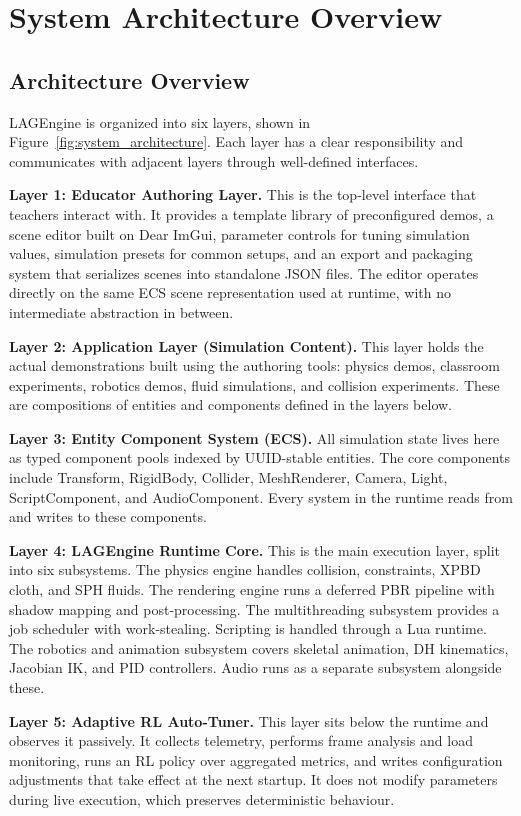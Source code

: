 \documentclass[9pt,openany]{extbook}
\begin{document}
\chapter{System Architecture Overview}

\section{Architecture Overview}

LAGEngine is organized into six layers, shown in Figure~\ref{fig:system_architecture}. Each layer has a clear responsibility and communicates with adjacent layers through well-defined interfaces.

\textbf{Layer 1: Educator Authoring Layer.}
This is the top-level interface that teachers interact with. It provides a template library of preconfigured demos, a scene editor built on Dear ImGui, parameter controls for tuning simulation values, simulation presets for common setups, and an export and packaging system that serializes scenes into standalone JSON files. The editor operates directly on the same ECS scene representation used at runtime, with no intermediate abstraction in between.

\textbf{Layer 2: Application Layer (Simulation Content).}
This layer holds the actual demonstrations built using the authoring tools: physics demos, classroom experiments, robotics demos, fluid simulations, and collision experiments. These are compositions of entities and components defined in the layers below.

\textbf{Layer 3: Entity Component System (ECS).}
All simulation state lives here as typed component pools indexed by UUID-stable entities. The core components include Transform, RigidBody, Collider, MeshRenderer, Camera, Light, ScriptComponent, and AudioComponent. Every system in the runtime reads from and writes to these components.

\textbf{Layer 4: LAGEngine Runtime Core.}
This is the main execution layer, split into six subsystems. The physics engine handles collision, constraints, XPBD cloth, and SPH fluids. The rendering engine runs a deferred PBR pipeline with shadow mapping and post-processing. The multithreading subsystem provides a job scheduler with work-stealing. Scripting is handled through a Lua runtime. The robotics and animation subsystem covers skeletal animation, DH kinematics, Jacobian IK, and PID controllers. Audio runs as a separate subsystem alongside these.

\textbf{Layer 5: Adaptive RL Auto-Tuner.}
This layer sits below the runtime and observes it passively. It collects telemetry, performs frame analysis and load monitoring, runs an RL policy over aggregated metrics, and writes configuration adjustments that take effect at the next startup. It does not modify parameters during live execution, which preserves deterministic behaviour.
\end{document}
